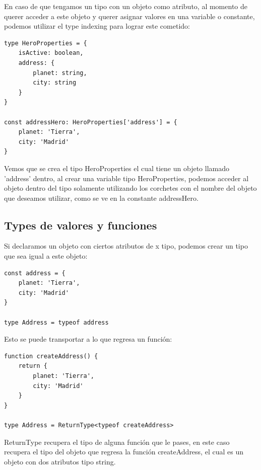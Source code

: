 En caso de que tengamos un tipo con un objeto como atributo, al momento de querer acceder a este objeto y querer asignar valores en una variable o constante, podemos utilizar el type indexing para lograr este cometido:
\begin{lstlisting}
type HeroProperties = {
    isActive: boolean,
    address: {
        planet: string,
        city: string
    }
}

const addressHero: HeroProperties['address'] = {
    planet: 'Tierra',
    city: 'Madrid'
}
\end{lstlisting}

Vemos que se crea el tipo HeroProperties el cual tiene un objeto llamado 'address' dentro, al crear una variable tipo HeroProperties, podemos acceder al objeto dentro del tipo solamente utilizando los corchetes con el nombre del objeto que deseamos utilizar, como se ve en la constante addressHero.


\subsection{Types de valores y funciones}

Si declaramos un objeto con ciertos atributos de x tipo, podemos crear un tipo que sea igual a este objeto:
\begin{lstlisting}
const address = {
    planet: 'Tierra',
    city: 'Madrid'
}

type Address = typeof address
\end{lstlisting}

Esto se puede transportar a lo que regresa un función:
\begin{lstlisting}
function createAddress() {
    return {
        planet: 'Tierra',
        city: 'Madrid'
    }
}

type Address = ReturnType<typeof createAddress>
\end{lstlisting}

ReturnType recupera el tipo de alguna función que le pases, en este caso recupera el tipo del objeto que regresa la función createAddress, el cual es un objeto con dos atributos tipo string.
